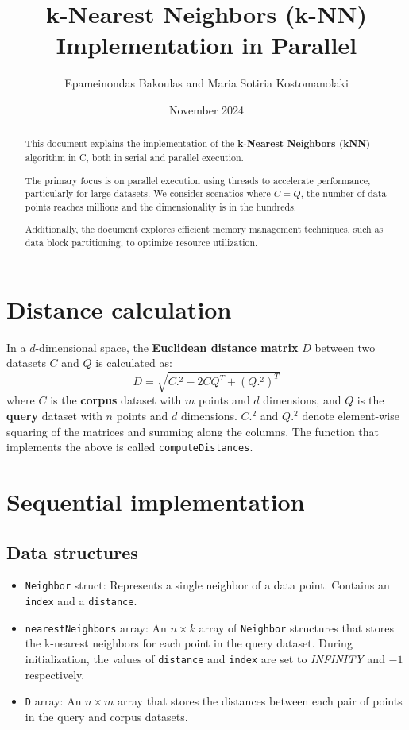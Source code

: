 \documentclass{article}
\title{k-Nearest Neighbors (k-NN) Implementation in Parallel}
\author{Epameinondas Bakoulas and Maria Sotiria Kostomanolaki}
\date{November 2024}
\begin{document}
\maketitle

\begin{abstract}
    This document explains the implementation of the \textbf{k-Nearest Neighbors (kNN)} algorithm in C, both in serial and parallel execution.
    
    The primary focus is on parallel execution using threads to accelerate performance, particularly for large datasets. We consider scenatios 
    where $C=Q$, the number of data points reaches millions and the dimensionality is in the hundreds. 

    Additionally, the document explores efficient memory management techniques, such as data block partitioning, to optimize resource utilization.
\end{abstract}

\section{Distance calculation}
In a $d$-dimensional space, the \textbf{Euclidean distance matrix} $D$ between two datasets 
$C$ and $Q$ is calculated as: 
\[
D = \sqrt{C.^2 - 2 C Q^T + (Q.^2)^T}
\]
where $C$ is the \textbf{corpus} dataset with $m$ points and $d$ dimensions, and $Q$ is the \textbf{query} dataset with $n$ points and $d$ dimensions.
$C.^2$ and $Q.^2$ denote element-wise squaring of the matrices and summing along the columns.
The function that implements the above is called \texttt{computeDistances}.


\section{Sequential implementation}

\subsection{Data structures} 

\begin{itemize}
    \item \texttt{Neighbor} struct: Represents a single neighbor of a data point. Contains an \texttt{index} and a \texttt{distance}.
    \item \texttt{nearestNeighbors} array: An $n \times k$ array of \texttt{Neighbor} structures that stores the k-nearest neighbors for each point in the query dataset. During initialization, 
    the values of \texttt{distance} and \texttt{index} are set to \emph{INFINITY} and $-1$ respectively.
    \item \texttt{D} array: An $n \times m$ array that stores the distances between each pair of points in the query and corpus datasets.
\end{itemize}
\end{document}
